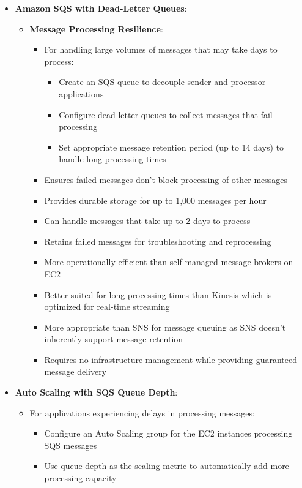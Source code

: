 \documentclass[11pt,a4paper]{report}
\begin{document}
\begin{itemize}
  \item \textbf{Amazon SQS with Dead-Letter Queues}:
\begin{itemize}
  \item \textbf{Message Processing Resilience}:
\begin{itemize}
  \item For handling large volumes of messages that may take days to process:
\begin{itemize}
  \item Create an SQS queue to decouple sender and processor applications
  \item Configure dead-letter queues to collect messages that fail processing
  \item Set appropriate message retention period (up to 14 days) to handle long processing times
\end{itemize}
  \item Ensures failed messages don't block processing of other messages
  \item Provides durable storage for up to 1,000 messages per hour
  \item Can handle messages that take up to 2 days to process
  \item Retains failed messages for troubleshooting and reprocessing
  \item More operationally efficient than self-managed message brokers on EC2
  \item Better suited for long processing times than Kinesis which is optimized for real-time streaming
  \item More appropriate than SNS for message queuing as SNS doesn't inherently support message retention
  \item Requires no infrastructure management while providing guaranteed message delivery
\end{itemize}
\end{itemize}
  \item \textbf{Auto Scaling with SQS Queue Depth}:
\begin{itemize}
  \item For applications experiencing delays in processing messages:
\begin{itemize}
  \item Configure an Auto Scaling group for the EC2 instances processing SQS messages
  \item Use queue depth as the scaling metric to automatically add more processing capacity
\end{itemize}

\end{itemize}
\end{itemize}
\end{document}
